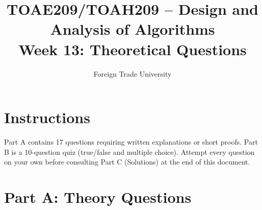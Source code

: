 \documentclass[11pt]{article}
\title{TOAE209/TOAH209 -- Design and Analysis of Algorithms\\[4pt]
\large Week 13: Theoretical Questions}
\author{Foreign Trade University}
\date{}
\begin{document}
\maketitle

\section*{Instructions}

Part A contains 17 questions requiring written explanations or short proofs.
Part B is a 10-question quiz (true/false and multiple choice). Attempt every
question on your own before consulting Part C (Solutions) at the end of this
document.

\section*{Part A: Theory Questions}
\end{document}
